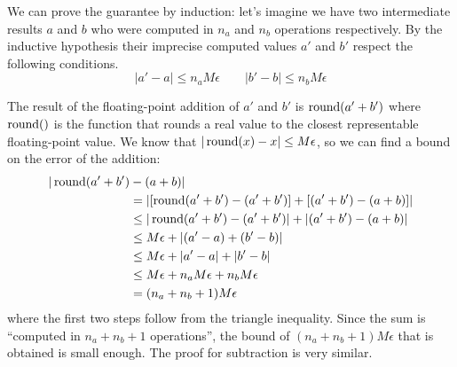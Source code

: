 


We can prove the guarantee by induction: let's imagine we have two intermediate results $a$ and $b$ who were computed in $n_a$ and $n_b$ operations respectively. By the inductive hypothesis their imprecise computed values $a'$ and $b'$ respect the following conditions.
\[|a'-a| \leq n_aM\epsilon \qquad |b'-b| \leq n_bM\epsilon\]

The result of the floating-point addition of $a'$ and $b'$ is $\operatorname{round}(a'+b')$ where $\operatorname{round}()$ is the function that rounds a real value to the closest representable floating-point value. We know that $|\operatorname{round}(x)-x| \leq M\epsilon$, so we can find a bound on the error of the addition:
\begin{align*}
|\operatorname{round}(a'+b') &- (a+b)|\\
&= \left|\left[\operatorname{round}(a'+b') - (a'+b')\right] + \left[(a'+b') - (a+b)\right]\right|\\
&\leq |\operatorname{round}(a'+b') - (a'+b')| + |(a'+b') - (a+b)|\\
&\leq M\epsilon + |(a'-a) + (b'-b)| \\
&\leq M\epsilon + |a'-a| + |b'-b| \\
&\leq M\epsilon + n_aM\epsilon + n_bM\epsilon \\
&= (n_a + n_b + 1) M \epsilon
\end{align*}
where the first two steps follow from the triangle inequality.
Since the sum is ``computed in $n_a+n_b+1$ operations'', the bound of $(n_a + n_b + 1) M \epsilon$ that is obtained is small enough. The proof for subtraction is very similar.

